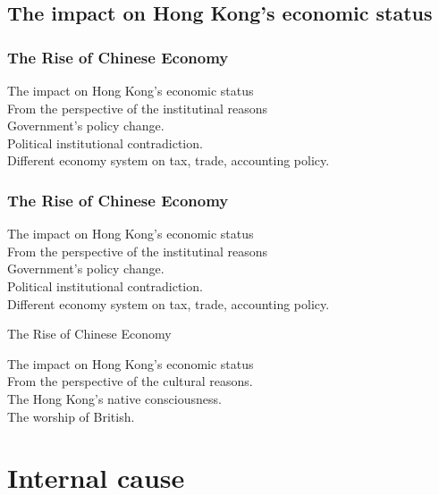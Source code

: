\documentclass[slidestop,uncompress,mathsans, 12pt]{beamer}
\begin{document}
\subsection{The impact on Hong Kong's economic status}
\begin{frame}
\frametitle{The Rise of Chinese Economy}
The impact on Hong Kong's economic status\\
\bigskip
From the perspective of the institutinal reasons\\
\bigskip
Government's policy change.\\
\bigskip
Political institutional contradiction.\\
\bigskip
Different economy system on tax, trade, accounting policy.
\end{frame}
\begin{frame}
\frametitle{The Rise of Chinese Economy}
The impact on Hong Kong's economic status\\
\bigskip
From the perspective of the institutinal reasons\\
\bigskip
Government's policy change.\\
\bigskip
Political institutional contradiction.\\
\bigskip
Different economy system on tax, trade, accounting policy.
\end{frame}
\begin{frame}{The Rise of Chinese Economy}

The impact on Hong Kong's economic status\\
\bigskip
From the perspective of the cultural reasons.\\
\bigskip
The Hong Kong’s native consciousness.\\
\bigskip
The worship of British.\\

\end{frame}
\section{Internal cause}
\end{document}

